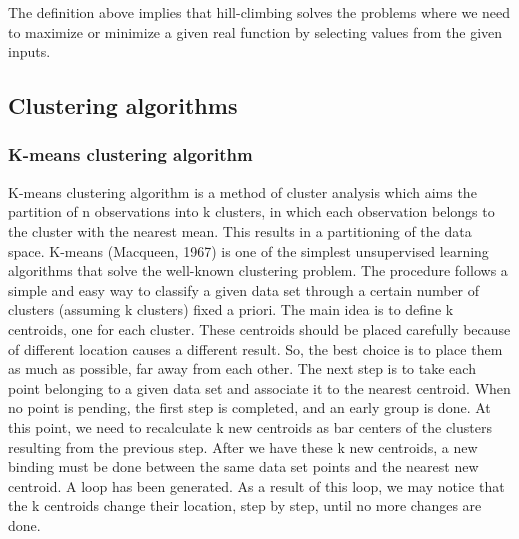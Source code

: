 The definition above implies that hill-climbing solves the problems where we need to maximize or minimize a given real function by selecting values from the given inputs.


\subsection{Clustering algorithms}

\subsubsection{K-means clustering algorithm}
\label{sub:kmeans}
K-means clustering algorithm \cite{HitchcockKmeans} is a method of cluster analysis which aims the partition of n observations into k clusters, in which each observation belongs to the cluster with the nearest mean. This results in a partitioning of the data space. K-means (Macqueen, 1967) is one of the simplest unsupervised learning algorithms that solve the well-known clustering problem. The procedure follows a simple and easy way to classify a given data set through a certain number of clusters (assuming k clusters) fixed a priori. The main idea is to define k centroids, one for each cluster. These centroids should be placed carefully because of different location causes a different result. So, the best choice is to place them as much as possible, far away from each other. The next step is to take each point belonging to a given data set and associate it to the nearest centroid. When no point is pending, the first step is completed, and an early group is done. At this point, we need to recalculate k new centroids as bar centers of the clusters resulting from the previous step. After we have these k new centroids, a new binding must be done between the same data set points and the nearest new centroid. A loop has been generated. As a result of this loop, we may notice that the k centroids change their location, step by step, until no more changes are done.

